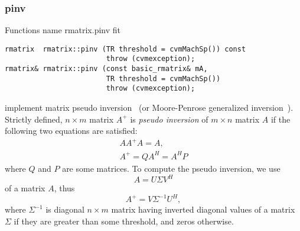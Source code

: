 \subsubsection{pinv}
Functions%
\pdfdest name {rmatrix.pinv} fit
\begin{verbatim}
rmatrix  rmatrix::pinv (TR threshold = cvmMachSp()) const 
                        throw (cvmexception);
rmatrix& rmatrix::pinv (const basic_rmatrix& mA, 
                        TR threshold = cvmMachSp()) 
                        throw (cvmexception);
\end{verbatim}
implement matrix pseudo inversion~
(or Moore-Penrose generalized inversion~).
Strictly defined,  $n\times m$ matrix $A^{+}$ is 
\textit{pseudo inversion} of $m\times n$ matrix $A$ if the following two equations
are satisfied:
\begin{gather*}
AA^{+}A=A,\\
A^{+}=QA^H=A^HP
\end{gather*}
where $Q$ and $P$ are some matrices. To compute the pseudo inversion, we use
\begin{equation*}
A = U\Sigma V^H
\end{equation*}
of a matrix $A$, thus
\begin{equation*}
A^{+} = V\Sigma^{-1}U^{H},
\end{equation*}
where $\Sigma^{-1}$ is  diagonal $n\times m$ matrix having inverted
diagonal values of a matrix $\Sigma$ if they are greater than some threshold,
and zeros otherwise.

